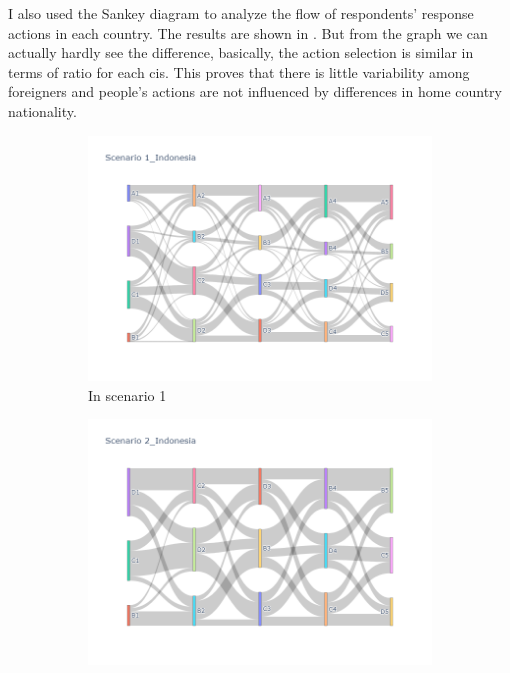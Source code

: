 I also used the Sankey diagram to analyze the flow of respondents' response actions in each country. The results are shown in . But from the graph we can actually hardly see the difference, basically, the action selection is similar in terms of ratio for each cis. This proves that there is little variability among foreigners and people's actions are not influenced by differences in home country nationality.

\begin{figure}[h]
  \begin{subfigure}{0.5\textwidth}
    \centering
    \includegraphics[width=\textwidth]{Figure/figure32a.png}
    \caption{In scenario 1}
    \label{fig32a}
  \end{subfigure}
  \begin{subfigure}{0.5\textwidth}
    \centering
    \includegraphics[width=\linewidth]{Figure/figure32b.png}

\end{subfigure}
\end{figure}
